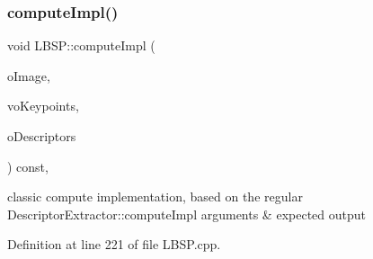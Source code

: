 \subsubsection{\texorpdfstring{compute\+Impl()}{computeImpl()}}
{\footnotesize\ttfamily void L\+B\+S\+P\+::compute\+Impl (\begin{DoxyParamCaption}\item[{const cv\+::\+Mat \&}]{o\+Image,  }\item[{std\+::vector$<$ cv\+::\+Key\+Point $>$ \&}]{vo\+Keypoints,  }\item[{cv\+::\+Mat \&}]{o\+Descriptors }\end{DoxyParamCaption}) const\hspace{0.3cm}{\ttfamily [protected]}, {\ttfamily [virtual]}}



classic \textquotesingle{}compute\textquotesingle{} implementation, based on the regular Descriptor\+Extractor\+::compute\+Impl arguments \& expected output 



Definition at line 221 of file L\+B\+S\+P.\+cpp.


